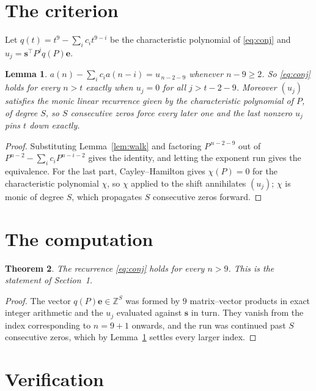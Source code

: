 \documentclass[11pt,a4paper]{article}
\theoremstyle{plain}
\newtheorem{theorem}{Theorem}
\newtheorem{lemma}[theorem]{Lemma}
\theoremstyle{definition}
\begin{document}
\section{The criterion}

Let $q(t)=t^{9}-\sum_i c_i t^{9-i}$ be the characteristic polynomial of
\eqref{eq:conj} and $u_j=\mathbf{s}^{\!\top}P^{j}q(P)\mathbf{e}$.

\begin{lemma}\label{lem:crit}
$a(n)-\sum_i c_i a(n-i)=u_{\,n-2-9}$ whenever $n-9\ge2$. So \eqref{eq:conj}
holds for every $n>t$ exactly when $u_j=0$ for all $j>t-2-9$. Moreover $(u_j)$
satisfies the monic linear recurrence given by the characteristic polynomial of $P$, of
degree $S$, so $S$ consecutive zeros force every later one and the last nonzero $u_j$ pins
$t$ down exactly.
\end{lemma}

\begin{proof}
Substituting Lemma~\ref{lem:walk} and factoring $P^{\,n-2-9}$ out of
$P^{n-2}-\sum_i c_i P^{n-i-2}$ gives the identity, and letting the exponent run gives the
equivalence. For the last part, Cayley--Hamilton gives $\chi(P)=0$ for the characteristic
polynomial $\chi$, so $\chi$ applied to the shift annihilates $(u_j)$; $\chi$ is monic of
degree $S$, which propagates $S$ consecutive zeros forward.
\end{proof}

\section{The computation}

\begin{theorem}
The recurrence \eqref{eq:conj} holds for every $n>9$. This is the statement of
Section~1.
\end{theorem}

\begin{proof}
The vector $q(P)\mathbf{e}\in\mathbb{Z}^{S}$ was formed by $9$ matrix--vector
products in exact integer arithmetic and the $u_j$ evaluated against $\mathbf{s}$ in turn.
They vanish from the index corresponding to $n=9+1$ onwards, and the run was continued
past $S$ consecutive zeros, which by Lemma~\ref{lem:crit} settles every larger index.
\end{proof}

\section{Verification}
\end{document}
